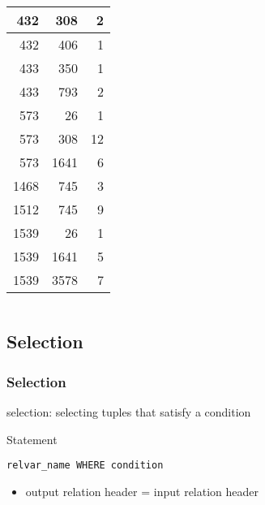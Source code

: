 \documentclass[dvipsnames]{beamer}
\theoremstyle{plain}
\begin{document}
\begin{frame}
\begin{example}[CASTING]
\begin{columns}[b]
      \begin{tiny}
      \begin{table}
        \begin{tabular}{|r|r|r|}\hline
    432 &     308 &   2\\\hline
    432 &     406 &   1\\\hline
    433 &     350 &   1\\\hline
    433 &     793 &   2\\\hline
    573 &      26 &   1\\\hline
    573 &     308 &  12\\\hline
    573 &    1641 &   6\\\hline
   1468 &     745 &   3\\\hline
   1512 &     745 &   9\\\hline
   1539 &      26 &   1\\\hline
   1539 &    1641 &   5\\\hline
   1539 &    3578 &   7\\\hline
        \end{tabular}
      \end{table}
      \end{tiny}
    \end{columns}
  \end{example}
\end{frame}

\subsection{Selection}

\begin{frame}[fragile]
  \frametitle{Selection}

  \begin{definition}
    \alert{selection}: selecting tuples that satisfy a condition
  \end{definition}

  \pause
  \begin{block}{Statement}
    \begin{lstlisting}
relvar_name WHERE condition
    \end{lstlisting}
  \end{block}

  \pause
  \begin{itemize}
    \item output relation header = input relation header
  \end{itemize}
\end{frame}
\end{document}
